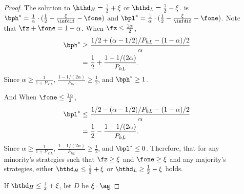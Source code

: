 \begin{proof}
    
    The solution to $\hthd_H = \frac12 + \xi$ or $\hthd_L = \frac12 - \xi$. is $\bph^* = \frac1\alpha \cdot (\frac12 + \frac{\xi}{\infdif} - \fone)$ and $\bpl^* = \frac1\alpha \cdot (\frac12 - \frac{\xi}{\infdif} - \fone)$. Note that $\fz + \fone = 1 - \alpha$. When $\fz \le \frac{1 \alpha}{2}$, 
    \begin{align*}
        \bph^* \ge&\ \frac{1/2 + (\alpha - 1/2) / P_{hL} - (1 - \alpha) / 2}{\alpha}\\
        =&\ \frac12 + \frac{1 - 1 / (2\alpha)}{P_{hL}}. 
    \end{align*}
    Since $\alpha \ge \frac{1}{1 + P_{\ell L}}$, $\frac{1 - 1 / (2\alpha)}{P_{hL}} \ge \frac12$, and $\bph^* \ge 1$. 

    And When $\fone \le \frac{1 \alpha}{2}$, 
    \begin{align*}
        \bpl^* \le&\ \frac{1/2 - (\alpha - 1/2) / P_{hL} - (1 - \alpha) / 2}{\alpha}\\
        =&\ \frac12 - \frac{1 - 1 / (2\alpha)}{P_{hL}}. 
    \end{align*}
    Since $\alpha \ge \frac{1}{1 + P_{\ell L}}$, $\frac{1 - 1 / (2\alpha)}{P_{hL}} \ge \frac12$, and $\bpl^* \le 0$. Therefore, that for any minority's strategies such that $\fz \ge \xi$ and $\fone \ge \xi$ and any majority's strategies, either $\hthd_H \le \frac12 + \xi$ or $\hthd_L \ge \frac12 - \xi$ holds.

    If $\hthd_H \le \frac12 + \xi$, let $D$ be $\xi\cdot \ag$ 
    
\end{proof}

